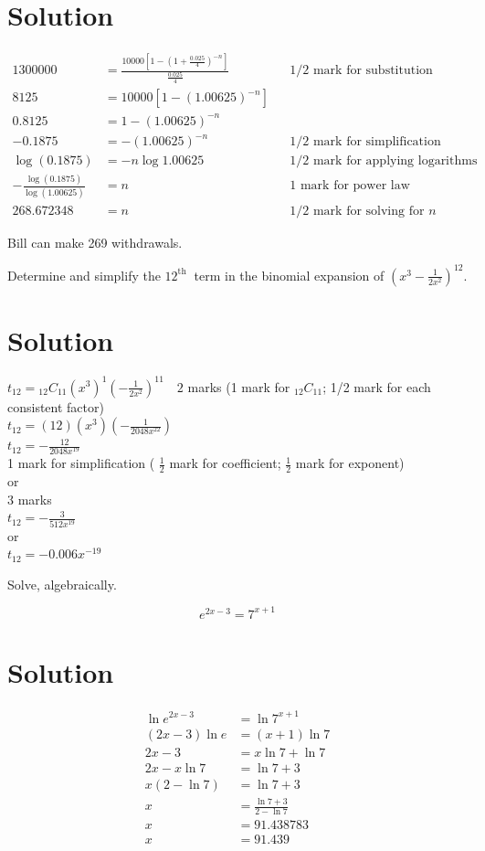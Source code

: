 \documentclass[10pt]{article}
\begin{document}
\section*{Solution}
$$
\begin{aligned}
1300000 & =\frac{10000\left[1-\left(1+\frac{0.025}{4}\right)^{-n}\right]}{\frac{0.025}{4}} & & 1 / 2 \text { mark for substitution } \\
8125 & =10000\left[1-(1.00625)^{-n}\right] & & \\
0.8125 & =1-(1.00625)^{-n} & & \\
-0.1875 & =-(1.00625)^{-n} & & 1 / 2 \text { mark for simplification } \\
\log (0.1875) & =-n \log 1.00625 & & 1 / 2 \text { mark for applying logarithms } \\
-\frac{\log (0.1875)}{\log (1.00625)} & =n & & 1 \text { mark for power law } \\
268.672348 & =n & & 1 / 2 \text { mark for solving for } n
\end{aligned}
$$

Bill can make 269 withdrawals.

Determine and simplify the $12^{\text {th }}$ term in the binomial expansion of $\left(x^{3}-\frac{1}{2 x^{2}}\right)^{12}$.

\section*{Solution}
$t_{12}={ }_{12} C_{11}\left(x^{3}\right)^{1}\left(-\frac{1}{2 x^{2}}\right)^{11} \quad 2$ marks (1 mark for ${ }_{12} C_{11}$; 1/2 mark for each consistent factor)\\
$t_{12}=(12)\left(x^{3}\right)\left(-\frac{1}{2048 x^{22}}\right)$\\
$t_{12}=-\frac{12}{2048 x^{19}}$\\
1 mark for simplification ( $\frac{1}{2}$ mark for coefficient; $\frac{1}{2}$ mark for exponent)\\
or\\
3 marks\\
$t_{12}=-\frac{3}{512 x^{19}}$\\
or\\
$t_{12}=-0.006 x^{-19}$

Solve, algebraically.

$$
e^{2 x-3}=7^{x+1}
$$

\section*{Solution}
$$
\begin{aligned}
\ln e^{2 x-3} & =\ln 7^{x+1} \\
(2 x-3) \ln e & =(x+1) \ln 7 \\
2 x-3 & =x \ln 7+\ln 7 \\
2 x-x \ln 7 & =\ln 7+3 \\
x(2-\ln 7) & =\ln 7+3 \\
x & =\frac{\ln 7+3}{2-\ln 7} \\
x & =91.438783 \\
x & =91.439
\end{aligned}
$$
\end{document}
